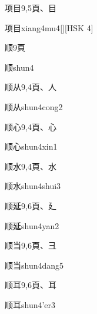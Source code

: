 \begin{entry}{项目}{9,5}{⾴、⽬}
  \begin{phonetics}{项目}{xiang4mu4}[][HSK 4]
  \end{phonetics}
\end{entry}

\begin{entry}{顺}{9}{⾴}
  \begin{phonetics}{顺}{shun4}
  \end{phonetics}
\end{entry}

\begin{entry}{顺从}{9,4}{⾴、⼈}
  \begin{phonetics}{顺从}{shun4cong2}
  \end{phonetics}
\end{entry}

\begin{entry}{顺心}{9,4}{⾴、⼼}
  \begin{phonetics}{顺心}{shun4xin1}
  \end{phonetics}
\end{entry}

\begin{entry}{顺水}{9,4}{⾴、⽔}
  \begin{phonetics}{顺水}{shun4shui3}
  \end{phonetics}
\end{entry}

\begin{entry}{顺延}{9,6}{⾴、⼵}
  \begin{phonetics}{顺延}{shun4yan2}
  \end{phonetics}
\end{entry}

\begin{entry}{顺当}{9,6}{⾴、⼹}
  \begin{phonetics}{顺当}{shun4dang5}
  \end{phonetics}
\end{entry}

\begin{entry}{顺耳}{9,6}{⾴、⽿}
  \begin{phonetics}{顺耳}{shun4'er3}
  \end{phonetics}
\end{entry}

